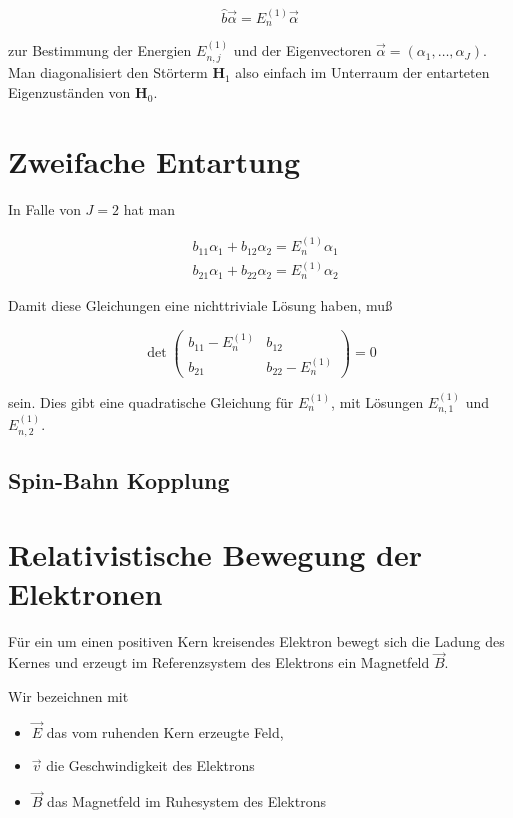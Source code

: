 \documentclass[10pt, letterpaper]{article}
\begin{document}
$$
\hat{b} \vec{\alpha}=E_{n}^{(1)} \vec{\alpha}
$$

zur Bestimmung der Energien $E_{n, j}^{(1)}$ und der Eigenvectoren $\vec{\alpha}=\left(\alpha_{1}, \ldots, \alpha_{J}\right)$. Man diagonalisiert den Störterm $\mathbf{H}_{1}$ also einfach im Unterraum der entarteten Eigenzuständen von $\mathbf{H}_{0}$.

\section*{Zweifache Entartung}
In Falle von $J=2$ hat man

$$
\begin{aligned}
& b_{11} \alpha_{1}+b_{12} \alpha_{2}=E_{n}^{(1)} \alpha_{1} \\
& b_{21} \alpha_{1}+b_{22} \alpha_{2}=E_{n}^{(1)} \alpha_{2}
\end{aligned}
$$

Damit diese Gleichungen eine nichttriviale Lösung haben, muß

$$
\operatorname{det}\left(\begin{array}{cc}
b_{11}-E_{n}^{(1)} & b_{12} \\
b_{21} & b_{22}-E_{n}^{(1)}
\end{array}\right)=0
$$

sein. Dies gibt eine quadratische Gleichung für $E_{n}^{(1)}$, mit Lösungen $E_{n, 1}^{(1)}$ und $E_{n, 2}^{(1)}$.

\subsection*{Spin-Bahn Kopplung}
\section*{Relativistische Bewegung der Elektronen}
Für ein um einen positiven Kern kreisendes Elektron bewegt sich die Ladung des Kernes und erzeugt im Referenzsystem des Elektrons ein Magnetfeld $\vec{B}$.

Wir bezeichnen mit

\begin{itemize}
  \item $\vec{E}$ das vom ruhenden Kern erzeugte Feld,
  \item $\vec{v}$ die Geschwindigkeit des Elektrons
  \item $\vec{B}$ das Magnetfeld im Ruhesystem des Elektrons
\end{itemize}
\end{document}

